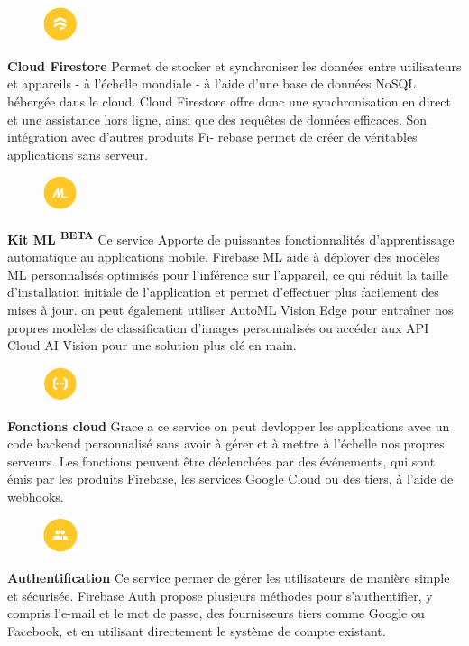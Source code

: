 \begin{figure}
 	\includegraphics[width=1cm]{images/Chapitre2/Firebase_services/firestore.PNG}
 \end{figure}
\textbf{Cloud Firestore} Permet de stocker et synchroniser les données entre utilisateurs et appareils - à l’échelle mondiale - à l’aide d’une base de données NoSQL hébergée dans le cloud. Cloud Firestore offre donc
une synchronisation en direct et une assistance hors ligne, ainsi que
des requêtes de données efficaces. Son intégration avec d’autres produits Fi-
rebase permet de créer de véritables applications sans serveur.\medskip

\begin{figure}
	\includegraphics[width=1cm]{images/Chapitre2/Firebase_services/mlkit.PNG}
\end{figure}
\textbf{Kit ML \textsuperscript{BETA}} Ce service Apporte de puissantes fonctionnalités
d'apprentissage automatique au applications mobile. Firebase ML aide
à déployer des modèles ML personnalisés optimisés pour l'inférence sur
l'appareil, ce qui réduit la taille d'installation initiale de
l'application et permet d'effectuer plus facilement des mises à jour.
on peut également utiliser AutoML Vision Edge pour entraîner nos
propres modèles de classification d'images personnalisés ou accéder aux
API Cloud AI Vision pour une solution plus clé en main.\medskip

\begin{figure}
	\includegraphics[width=1cm]{images/Chapitre2/Firebase_services/cloud_function.PNG}
\end{figure}
\textbf{Fonctions cloud} Grace a ce service on peut devlopper les applications avec
un code backend personnalisé
sans avoir à gérer et à mettre à l'échelle nos propres serveurs.
Les fonctions peuvent être déclenchées par des événements, qui sont
émis par les produits Firebase, les services Google Cloud ou des tiers,
à l'aide de webhooks.\medskip

\begin{figure}
	\includegraphics[width=1cm]{images/Chapitre2/Firebase_services/authentication.PNG}
\end{figure}
\textbf{Authentification} Ce service permer de gérer les utilisateurs de manière simple et sécurisée.
Firebase Auth propose plusieurs méthodes pour s'authentifier,
y compris l'e-mail et le mot de passe, des fournisseurs tiers
comme Google ou Facebook, et en utilisant directement le
système de compte existant.\medskip

